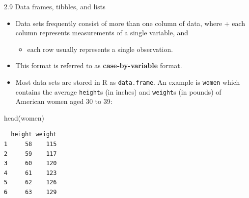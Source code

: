\documentclass[
  9pt,
  a4paper,
  ignorenonframetext,
  notheorems]{beamer}
\newenvironment{Shaded}{\begin{snugshade}}{\end{snugshade}}
\newcommand{\FunctionTok}[1]{\textcolor[rgb]{0.28,0.35,0.67}{#1}}
\newcommand{\NormalTok}[1]{\textcolor[rgb]{0.00,0.23,0.31}{#1}}
\providecommand{\tightlist}{%
  \setlength{\itemsep}{0pt}\setlength{\parskip}{0pt}}\usepackage{longtable,booktabs,array}
\begin{document}
\begin{frame}[fragile]{2.9 Data frames, tibbles, and lists}
\protect\hypertarget{data-frames-tibbles-and-lists}{}
\begin{itemize}
\tightlist
\item
  Data sets frequently consist of more than one column of data, where +
  each column represents measurements of a single variable, and

  \begin{itemize}
  \tightlist
  \item
    each row usually represents a single observation.
  \end{itemize}
\item
  This format is referred to as \textbf{case-by-variable} format.
\end{itemize}

\begin{itemize}
\tightlist
\item
  Most data sets are stored in R as \texttt{data.frame}. An example is
  \texttt{women} which contains the average \texttt{height}s (in inches)
  and \texttt{weight}s (in pounds) of American women aged 30 to 39:
\end{itemize}

\begin{Shaded}
\begin{Highlighting}[]
\FunctionTok{head}\NormalTok{(women)}
\end{Highlighting}
\end{Shaded}

\begin{verbatim}
  height weight
1     58    115
2     59    117
3     60    120
4     61    123
5     62    126
6     63    129
\end{verbatim}
\end{frame}
\end{document}
